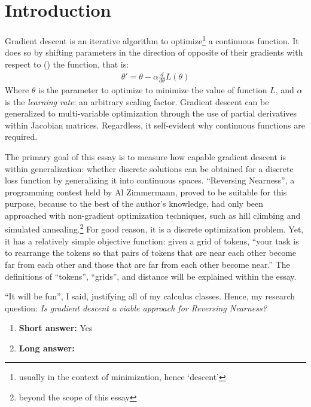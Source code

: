 \section{Introduction}%
\label{sec:introduction}

Gradient descent is an iterative algorithm to optimize\footnote{usually in the context of minimization, hence `descent'} a continuous function. It does so by shifting parameters in the direction of opposite of their gradients with respect to (\wrt{}) the function, that is:%
\begin{align*}
         \theta'=\theta-\alpha \frac{d}{d\theta}L(\theta)
\end{align*}
Where $\theta$ is the parameter to optimize to minimize the value of function $L$, and $\alpha$ is the \emph{learning rate}: an arbitrary scaling factor. Gradient descent can be generalized to multi-variable optimization through the use of partial derivatives within Jacobian matrices. Regardless, it self-evident why continuous functions are required.

The primary goal of this essay is to measure how capable gradient descent is within generalization: whether discrete solutions can be obtained for a discrete loss function by generalizing it into continuous spaces. ``Reversing Nearness'', a programming contest held by Al Zimmermann, proved to be suitable for this purpose, because to the best of the author's knowledge, had only been approached with non-gradient optimization techniques, such as hill climbing and simulated annealing.\footnote{beyond the scope of this essay} For good reason, it is a discrete optimization problem. Yet, it has a relatively simple objective function: given a grid of tokens, ``your task is to rearrange the tokens so that pairs of tokens that are near each other become far from each other and those that are far from each other become near.''\cite{zimmermann} The definitions of ``tokens'', ``grids'', and distance will be explained within the essay.

``It will be fun'', I said, justifying all of my calculus classes. Hence, my research question: \emph{Is gradient descent a viable approach for \emph{Reversing Nearness}?}

\begin{enumerate}
  \item \textbf{Short answer:} Yes
  \item \textbf{Long answer:}
\end{enumerate}
